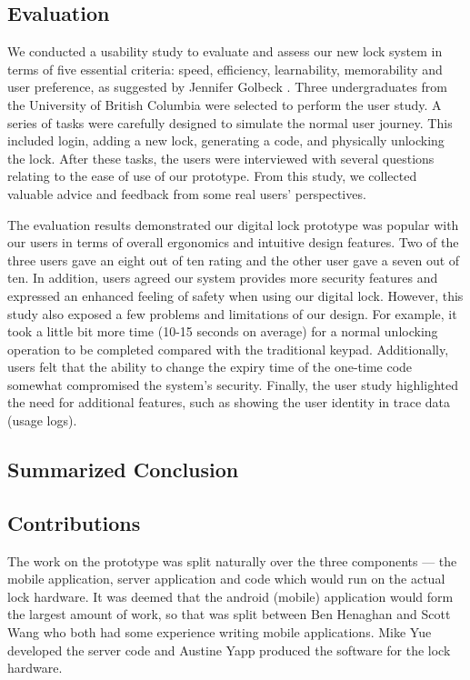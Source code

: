 \documentclass[conference]{IEEEtran}
\begin{document}
\subsection{Evaluation}
We conducted a usability study to evaluate and assess our new lock system in terms of five essential criteria: speed, efficiency, learnability, memorability and user preference, as suggested by Jennifer Golbeck \cite{JG}. Three undergraduates from the University of British Columbia were selected to perform the user study. A series of tasks were carefully designed to simulate the normal user journey. This included login, adding a new lock, generating a code, and physically unlocking the lock. After these tasks, the users were interviewed with several questions relating to the ease of use of our prototype. From this study, we collected valuable advice and feedback from some real users’ perspectives.

The evaluation results demonstrated our digital lock prototype was popular with our users in terms of overall ergonomics and intuitive design features. Two of the three users gave an eight out of ten rating and the other user gave a seven out of ten. In addition, users agreed our system provides more security features and expressed an enhanced feeling of safety when using our digital lock. However, this study also exposed a few problems and limitations of our design. For example, it took a little bit more time (10-15 seconds on average) for a normal unlocking operation to be completed compared with the traditional keypad. Additionally, users felt that the ability to change the expiry time of the one-time code somewhat compromised the system's security. Finally, the user study highlighted the need for additional features, such as showing the user identity in trace data (usage logs).

\subsection{Summarized Conclusion}

\subsection{Contributions}
The work on the prototype was split naturally over the three components --- the mobile application, server application and code which would run on the actual lock hardware.
It was deemed that the android (mobile) application would form the largest amount of work, so that was split between Ben Henaghan and Scott Wang who both had some experience writing mobile applications.
Mike Yue developed the server code and Austine Yapp produced the software for the lock hardware.
\end{document}
